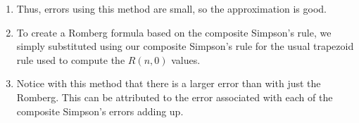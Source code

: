 \documentclass{article}
\begin{document}
\begin{enumerate}
\item {} Thus, errors using this method are small, so the approximation is good. 

\item To create a Romberg formula based on the composite Simpson's rule, we simply substituted using our composite Simpson's rule for the usual trapezoid rule used to compute the $R(n,0)$ values. 

\item {} Notice with this method that there is a larger error than with just the Romberg. This can be attributed to the error associated with each of the composite Simpson's errors adding up. 

\end{enumerate}
	

	
\end{document}
